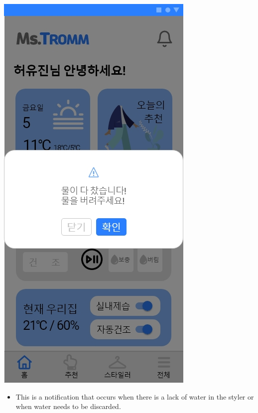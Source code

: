 \documentclass[conference]{IEEEtran}
\begin{document}
\begin{enumerate}
{\includegraphics[scale=0.25]{8-1. 스타일러 알림.jpg}}
\break
    \begin{itemize}
    \item[] This is a notification that occurs when there is a lack of water in the styler or when water needs to be discarded. \\ \\
\end{itemize}
\end{enumerate}
\end{document}
